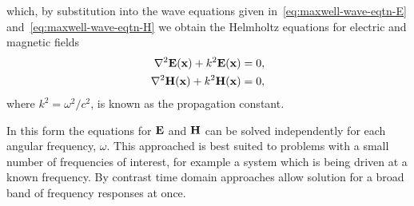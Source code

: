 which, by substitution into the wave equations given
in~\eqref{eq:maxwell-wave-eqtn-E} and~\eqref{eq:maxwell-wave-eqtn-H} we obtain
the Helmholtz equations for electric and magnetic fields
\begin{align}
  \label{eq:helmholtz}
  \nabla^2 \mathbf{E}(\mathbf{x}) + k^2 \mathbf{E}(\mathbf{x}) = 0, \\
  \nabla^2 \mathbf{H}(\mathbf{x}) + k^2 \mathbf{H}(\mathbf{x}) = 0,
\end{align}
where $k^2 =\omega^2/c^2$, is known as the propagation constant.

In this form the equations for $\mathbf{E}$ and $\mathbf{H}$ can be solved independently for
each angular frequency, $\omega$. This approached is best suited to problems
with a small number of frequencies of interest, for example a system which is
being driven at a known frequency. By contrast time domain approaches allow
solution for a broad band of frequency responses at once.




